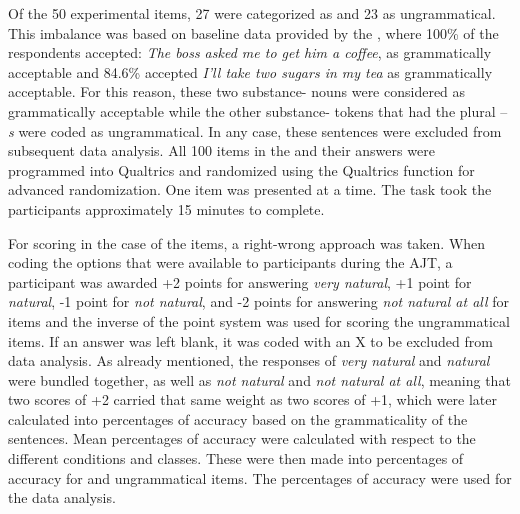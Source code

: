\documentclass[output=paper]{langsci/langscibook}
\begin{document}
\largerpage
Of the 50 experimental items, 27 were categorized as  and 23 as ungrammatical. This imbalance was based on baseline data provided by the , where 100\% of the respondents accepted: \textit{The boss asked me to get him a coffee}, as grammatically acceptable and 84.6\% accepted \textit{I’ll take two sugars in my tea} as grammatically acceptable. For this reason, these two substance- nouns were considered as grammatically acceptable while the other substance- tokens that had the plural –\textit{s} were coded as ungrammatical. In any case, these sentences were excluded from subsequent data analysis. All 100 items in the  and their answers were programmed into Qualtrics and randomized using the Qualtrics function for advanced randomization. One item was presented at a time. The task took the participants approximately 15 minutes to complete. 

For scoring in the case of the  items, a right-wrong approach was taken. When coding the options that were available to participants during the AJT, a participant was awarded +2 points for answering \textit{very natural}, +1 point for \textit{natural}, -1 point for \textit{not natural}, and -2 points for answering \textit{not natural at all} for  items and the inverse of the point system was used for scoring the ungrammatical items. If an answer was left blank, it was coded with an X to be excluded from data analysis. As already mentioned, the responses of \textit{very natural} and \textit{natural} were bundled together, as well as \textit{not natural} and \textit{not natural at all}, meaning that two scores of +2 carried that same weight as two scores of +1, which were later calculated into percentages of accuracy based on the grammaticality of the sentences. Mean percentages of accuracy were calculated with respect to the different conditions and classes. These were then made into percentages of accuracy for  and ungrammatical items. The percentages of accuracy were used for the data analysis.
\end{document}
